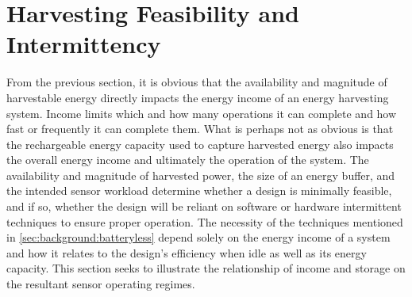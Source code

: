 %
%
%
%
%
%
%
%
%
%
%
%
%
%
%
%
%
%
%
%


\section{Harvesting Feasibility and Intermittency}
\label{sec:intuition:feasibility}
From the previous section, it is obvious that the availability and magnitude of harvestable energy directly impacts the energy income of an energy harvesting system.
Income limits which and how many operations it can complete and how fast or frequently it can complete them.
What is perhaps not as obvious is that the rechargeable energy capacity used to capture harvested energy also impacts the overall energy income and ultimately the operation of the system.
The availability and magnitude of harvested power, the size of an energy buffer, and the intended sensor workload determine whether a design is minimally feasible, and if so, whether the design will be reliant on software or hardware intermittent techniques to ensure proper operation.
The necessity of the techniques mentioned in \cref{sec:background:batteryless} depend solely on the energy income of a system and how it relates to the design's efficiency when idle as well as its energy capacity.
This section seeks to illustrate the relationship of income and storage on the resultant sensor operating regimes.


